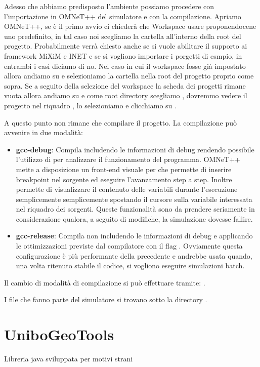 Adesso che abbiamo predisposto l'ambiente possiamo procedere con l'importazione in OMNeT++ del simulatore e con la compilazione. Apriamo OMNeT++, se è il primo avvio ci chiederà che Workspace usare proponendocene uno predefinito, in tal caso noi scegliamo la cartella  all'interno della root del progetto. Probabilmente verrà chiesto anche se si vuole abilitare il supporto ai framework MiXiM e INET e se si vogliono importare i porgetti di esmpio, in entrambi i casi diciamo di no. Nel caso in cui il workspace fosse già impostato allora andiamo su  e selezioniamo la cartella  nella root del progetto proprio come sopra. Se a seguito della selezione del workspace  la scheda dei progetti rimane vuota allora andiamo su  e come root directory scegliamo , dovremmo vedere il progetto  nel riquadro , lo selezioniamo e clicchiamo su .

A questo punto non rimane che compilare il progetto. La compilazione può avvenire in due modalità:

\begin{itemize}
	\item \textbf{gcc-debug}: Compila includendo le informazioni di debug rendendo possibile l'utilizzo di  per analizzare il funzionamento del programma. OMNeT++ mette a disposizione un front-end visuale per  che permette di inserire breakpoint nel sorgente ed eseguire l'avanzamento step a step. Inoltre permette di visualizzare il contenuto delle variabili durante l'esecuzione semplicemente semplicemente spostando il cursore sulla variabile interessata nel riquadro dei sorgenti. Queste funzionalità sono da prendere seriamente in considerazione qualora, a seguito di modifiche, la simulazione dovesse fallire.
	\item \textbf{gcc-release}: Compila non includendo le informazioni di debug e applicando le ottimizzazioni previste dal compilatore  con il flag . Ovviamente questa configurazione è più performante della precedente e andrebbe usata quando, una volta ritenuto stabile il codice, si vogliono eseguire simulazioni batch.
\end{itemize}

Il cambio di modalità di compilazione si può effettuare tramite: .

I file che fanno parte del simulatore si trovano sotto la directory . 


\chapter{UniboGeoTools}

Libreria java sviluppata per motivi strani